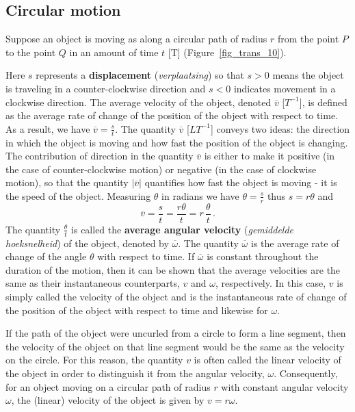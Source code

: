 \begin{example}
\begin{figure}[H]
\end{figure}


\end{example}
\fi
\ifcourse
\subsection{Circular motion}
Suppose an object is moving as along a circular path of radius $r$ from the point $P$ to the point $Q$ in an amount of time $t$ [T] (Figure~\ref{fig_trans_10}).  




 
Here $s$ represents a \textbf{displacement}  (\textit{verplaatsing})  so that  $s > 0$ means the object is traveling in a counter-clockwise direction and $s<0$ indicates movement in a clockwise direction. The average velocity of the object, denoted $\overline{v}$ [$T^{-1}$], is defined as the average rate of change of the position of the object with respect to time. As a result, we have $\overline{v} = \frac{s}{t}$.  The quantity $\overline{v}$ [$LT^{-1}$]  conveys two ideas: the direction in which the object is moving and how fast the position of the object is changing.  The contribution of direction in the quantity $\overline{v}$ is either to make it positive (in the case of counter-clockwise motion) or negative (in the case of clockwise motion), so that the quantity $\left| \overline{v} \right|$ quantifies how fast the object is moving - it is the speed of the object. Measuring $\theta$ in radians we have $\theta = \frac{s}{r}$ thus $s = r \theta$ and 
 \[ \overline{v} = \frac{s}{t} = \frac{r \theta}{t} = r \,\frac{\theta}{t} \,.\] 
The quantity $\frac{\theta}{t}$ is called the \textbf{average angular velocity} (\textit{gemiddelde hoeksnelheid})  of the object, denoted by $\overline{\omega}$.  The quantity $\overline{\omega}$  is the average rate of change of the angle $\theta$ with respect to time. If $\overline{\omega}$ is constant throughout the duration of the motion, then it can be shown that the average  velocities are the same as their instantaneous counterparts, $v$ and $\omega$, respectively.  In this case, $v$ is simply called the velocity of the object and is the instantaneous rate of change of the position of the object with respect to time and likewise for  $\omega$. 

If the path of the object were uncurled from a circle to form a line segment, then the velocity of the object on that line segment would be the same as the velocity on the circle.  For this reason, the quantity $v$ is often called the linear velocity of the object in order to distinguish it from the angular velocity, $\omega$. Consequently, for an object moving on a circular path of radius $r$ with constant angular velocity $\omega$, the (linear) velocity of the object is given by $v = r \omega$.  

